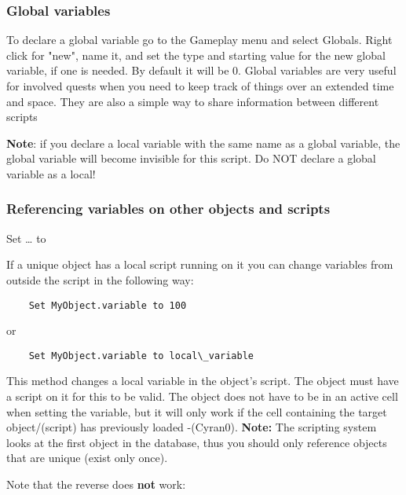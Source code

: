 \hypertarget{global-variables}{%
\subsubsection{Global variables}\label{global-variables}}

To declare a global variable go to the Gameplay menu and select Globals.
Right click for "new", name it, and set the type and starting value for
the new global variable, if one is needed. By default it will be 0.
Global variables are very useful for involved quests when you need to
keep track of things over an extended time and space. They are also a
simple way to share information between different scripts

\textbf{Note}: if you declare a local variable with the same name as a
global variable, the global variable will become invisible for this
script. Do NOT declare a global variable as a local!

\hypertarget{referencing-variables-on-other-objects-and-scripts}{%
\subsubsection{Referencing variables on other objects and
scripts}\label{referencing-variables-on-other-objects-and-scripts}}

Set \ldots{} to

If a unique object has a local script running on it you can change
variables from outside the script in the following way:

\begin{lstlisting}
	Set MyObject.variable to 100
\end{lstlisting}

or

\begin{lstlisting}
	Set MyObject.variable to local\_variable
\end{lstlisting}

This method changes a local variable in the object's script. The object
must have a script on it for this to be valid. The object does not have
to be in an active cell when setting the variable, but it will only work
if the cell containing the target object/(script) has previously loaded
-(Cyran0). \textbf{Note:} The scripting system looks at the first object
in the database, thus you should only reference objects that are unique
(exist only once).

Note that the reverse does \textbf{not} work:

